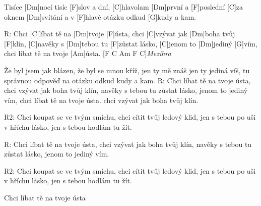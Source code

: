 
Tisíce [Dm]nocí tisíc [F]slov a dní,
[C]hlavolam [Dm]první a [F]poslední
[C]za oknem [Dm]svítání a v [F]hlavě otázku odkud [G]kudy a kam.

R:
Chci [C]líbat tě na [Dm]tvoje [F]\null ústa,
chci [C]vzývat jak [Dm]boha tvůj [F]klín,
[C]navěky s [Dm]tebou tu [F]zůstat lásko,
[C]jenom to [Dm]jediný [G]vím,
chci líbat tě na tvoje [Am]\null ústa.
[F C Am F C]\null\textit{Mezihra}

Že byl jsem jak blázen, že byl se mnou kříž,
jen ty mě znáš jen ty jediná víš,
tu správnou odpověď na otázku odkud kudy a kam.
\slpc
R:
Chci líbat tě na tvoje ústa,
chci vzývat jak boha tvůj klín,
navěky s tebou tu zůstat lásko,
jenom to jediný vím,
chci líbat tě na tvoje ústa.
chci vzývat jak boha tvůj klín.

R2:
Chci koupat se ve tvým smíchu,
chci cítit tvůj ledový klid,
jen s tebou po uši v hříchu lásko,
jen s tebou hodlám tu žít.

R:
Chci líbat tě na tvoje ústa,
chci vzývat jak boha tvůj klín,
navěky s tebou tu zůstat lásko,
jenom to jediný vím.

R2:
Chci koupat se ve tvým smíchu,
chci cítit tvůj ledový klid,
jen s tebou po uši v hříchu lásko,
jen s tebou hodlám tu žít.

Chci líbat tě na tvoje ústa

